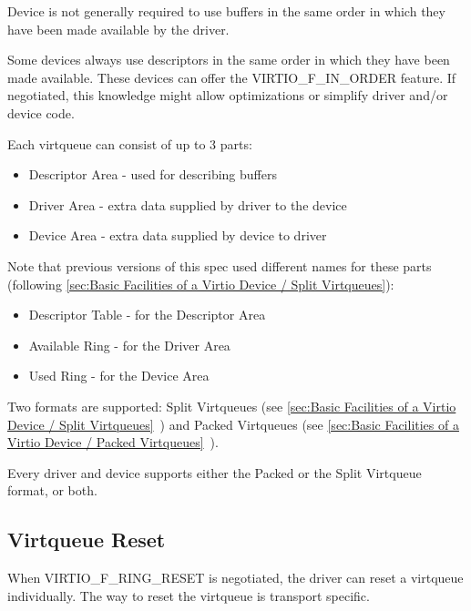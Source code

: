 Device is not generally required to use buffers in
the same order in which they have been made available
by the driver.

Some devices always use descriptors in the same order in which
they have been made available. These devices can offer the
VIRTIO_F_IN_ORDER feature. If negotiated, this knowledge
might allow optimizations or simplify driver and/or device code.

Each virtqueue can consist of up to 3 parts:
\begin{itemize}
\item Descriptor Area - used for describing buffers
\item Driver Area - extra data supplied by driver to the device
\item Device Area - extra data supplied by device to driver
\end{itemize}

\begin{note}
Note that previous versions of this spec used different names for
these parts (following \ref{sec:Basic Facilities of a Virtio Device / Split Virtqueues}):
\begin{itemize}
\item Descriptor Table - for the Descriptor Area
\item Available Ring - for the Driver Area
\item Used Ring - for the Device Area
\end{itemize}

\end{note}

Two formats are supported: Split Virtqueues (see \ref{sec:Basic
Facilities of a Virtio Device / Split
Virtqueues}~) and Packed Virtqueues (see \ref{sec:Basic
Facilities of a Virtio Device / Packed
Virtqueues}~).

Every driver and device supports either the Packed or the Split
Virtqueue format, or both.

\subsection{Virtqueue Reset}\label{sec:Basic Facilities of a Virtio Device / Virtqueues / Virtqueue Reset}

When VIRTIO_F_RING_RESET is negotiated, the driver can reset a virtqueue
individually. The way to reset the virtqueue is transport specific.

